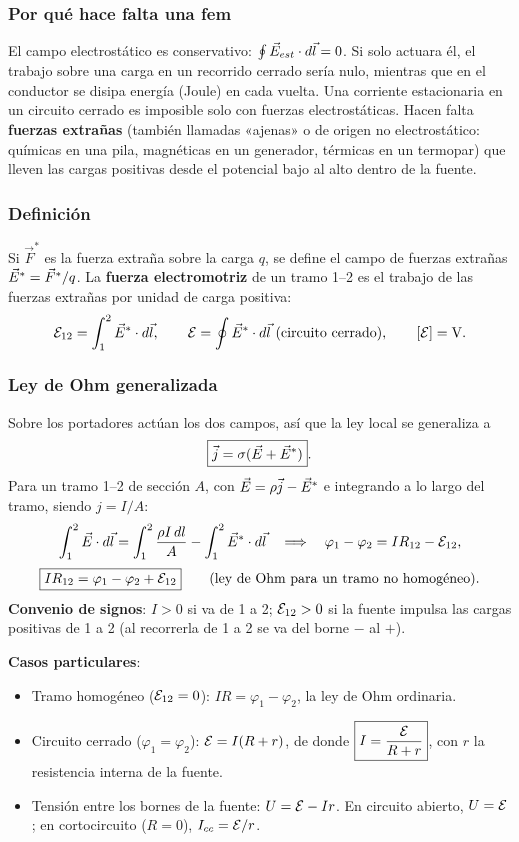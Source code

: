 \documentclass[11pt]{article}
\begin{document}
\subsubsection*{Por qué hace falta una fem}
El campo electrostático es conservativo: $\oint\vec{E}_{est}\cdot d\vec l=0$. Si solo actuara él, el trabajo sobre una carga en un recorrido cerrado sería nulo, mientras que en el conductor se disipa energía (Joule) en cada vuelta. Una corriente estacionaria en un circuito cerrado es imposible solo con fuerzas electrostáticas. Hacen falta \textbf{fuerzas extrañas} (también llamadas «ajenas» o de origen no electrostático: químicas en una pila, magnéticas en un generador, térmicas en un termopar) que lleven las cargas positivas desde el potencial bajo al alto dentro de la fuente.

\subsubsection*{Definición}
Si $\vec F^*$ es la fuerza extraña sobre la carga $q$, se define el campo de fuerzas extrañas $\vec{E}^*=\vec F^*/q$. La \textbf{fuerza electromotriz} de un tramo 1--2 es el trabajo de las fuerzas extrañas por unidad de carga positiva:
\[
\mathcal{E}_{12}=\int_1^2\vec{E}^*\cdot d\vec l,\qquad\mathcal{E}=\oint\vec{E}^*\cdot d\vec l\ \text{(circuito cerrado)},\qquad[\mathcal{E}]=\mathrm{V}.
\]

\subsubsection*{Ley de Ohm generalizada}
Sobre los portadores actúan los dos campos, así que la ley local se generaliza a
\[
\boxed{\vec{j}=\sigma(\vec{E}+\vec{E}^*)}.
\]
Para un tramo 1--2 de sección $A$, con $\vec{E}=\rho\vec{j}-\vec{E}^*$ e integrando a lo largo del tramo, siendo $j=I/A$:
\[
\int_1^2\vec{E}\cdot d\vec l=\int_1^2\frac{\rho I\,dl}{A}-\int_1^2\vec{E}^*\cdot d\vec l
\quad\Longrightarrow\quad\varphi_1-\varphi_2=IR_{12}-\mathcal{E}_{12},
\]
\[
\boxed{IR_{12}=\varphi_1-\varphi_2+\mathcal{E}_{12}}\qquad\text{(ley de Ohm para un tramo no homogéneo).}
\]
\textbf{Convenio de signos}: $I>0$ si va de 1 a 2; $\mathcal{E}_{12}>0$ si la fuente impulsa las cargas positivas de 1 a 2 (al recorrerla de 1 a 2 se va del borne $-$ al $+$).

\textbf{Casos particulares}:
\begin{itemize}
\item Tramo homogéneo ($\mathcal{E}_{12}=0$): $IR=\varphi_1-\varphi_2$, la ley de Ohm ordinaria.
\item Circuito cerrado ($\varphi_1=\varphi_2$): $\mathcal{E}=I(R+r)$, de donde $\boxed{I=\dfrac{\mathcal{E}}{R+r}}$, con $r$ la resistencia interna de la fuente.
\item Tensión entre los bornes de la fuente: $U=\mathcal{E}-Ir$. En circuito abierto, $U=\mathcal{E}$; en cortocircuito ($R=0$), $I_{cc}=\mathcal{E}/r$.
\end{itemize}
\end{document}
